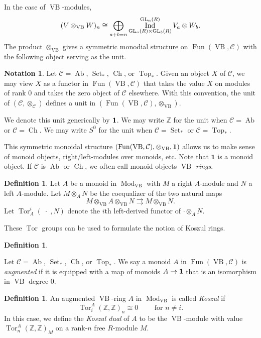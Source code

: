 \documentclass[a4paper]{amsart}
\DeclareMathOperator{\Mod}{Mod}
\DeclareMathOperator{\Tor}{Tor}
\DeclareMathOperator{\VB}{VB}
\DeclareMathOperator{\Ch}{Ch}
\DeclareMathOperator{\Ab}{Ab}
\DeclareMathOperator{\Top}{Top}
\DeclareMathOperator{\Set}{Set}
\DeclareMathOperator{\Fun}{Fun}
\DeclareMathOperator{\Ind}{Ind}
\newcommand{\m}{\to}
\newcommand{\cC}{\mathcal{C}}\newcommand{\cD}{\mathcal{D}}
\newcommand{\Z}{\mathbb{Z}}
\numberwithin{theoremcounter}{section}
\theoremstyle{definition}
\newtheorem{definition}[Defauto]{Definition}
\newtheorem{notation}[notationauto]{Notation}
\theoremstyle{remark}
\newcommand{\mr}[1]{{\rm #1}}
\newcommand{\GL}{\mr{GL}}
\begin{document}
In the case of $\VB$-modules,  $$(V \otimes_{\VB} W)_n \cong \bigoplus_{a +b=n} \Ind^{\GL_n(R)}_{\GL_a(R) \times \GL_b(R)}V_a \otimes W_b.$$ The product $\otimes_{\VB}$ gives a symmetric monodial structure on $\Fun(\VB,\cC)$ with the following object serving as the unit.


\begin{notation} Let $\cC= \Ab$, ${\Set_*}$, $\Ch$, or ${\Top_*}$. Given an object $X$ of $\mathcal{C}$, we may view $X$ as a functor in $\Fun(\VB, \mathcal{C})$ that takes the value $X$ on modules of rank $0$ and takes the zero object of $\mathcal{C}$ elsewhere. With this convention, the unit of $(\mathcal{C}, \otimes_{\mathcal{C}})$ defines a unit in $(\Fun(\VB,\cC), \otimes_{\VB})$. 
 
 We denote this unit generically by ${\bf 1}$. We may write $\Z$ for the unit when $\cC= \Ab$ or $\cC=\Ch$. We may write $S^0$ for the unit when $\cC={\Set_*}$ or $\cC={\Top_*}$. 
 \end{notation}



This symmetric monoidal structure  $(\Fun(\VB,\cC), \otimes_{\VB}, {\bf 1})$  allows us to make sense of monoid objects, right/left-modules over monoids, etc. Note that $\mathbf 1$ is a monoid object. If $\cC$ is $\Ab$ or $\Ch$, we often call monoid objects \emph{$\VB$-rings}.

\begin{definition}
Let $A$ be a monoid in $\Mod_{\VB}$ with $M$ a right $A$-module and $N$ a left $A$-module. Let $M \otimes_A N$ be the coequalizer of the two natural maps $$ M \otimes_{\VB} A \otimes_{\VB} N \rightrightarrows M \otimes_{\VB} N.$$ Let $\Tor^i_A(\;\cdot\;,N)$ denote the $i$th left-derived functor of $\cdot \otimes_A N$.
\end{definition}


These $\Tor$ groups can be used to formulate the notion of Koszul rings.

\begin{definition} \label{DefnAugmented}

Let $\cC= \Ab$, ${\Set_*}$, $\Ch$, or ${\Top_*}$. We say a monoid $A$ in $\Fun(\VB, \cC)$ is \emph{augmented} if it is equipped with a map of monoids $A \m {\bf 1}$ that is an isomorphism in $\VB$-degree $0$. 
\end{definition}


\begin{definition} \label{DefnKoszul}
An augmented $\VB$-ring $A$ in $\Mod_{\VB}$ is called \emph{Koszul} if $$\Tor^A_i(\Z,\Z)_n \cong 0 \qquad \text{ for $n \neq i$.} $$   In this case, we define the \emph{Koszul dual} of $A$ to be the $\VB$-module with value $\Tor^A_n(\Z,\Z)_M$ on a rank-$n$ free $R$-module $M$. 
\end{definition}
\end{document}
